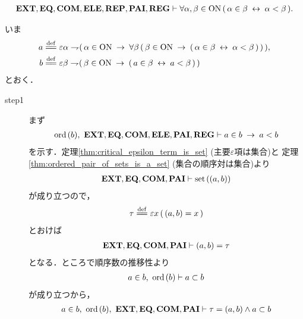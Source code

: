 	\begin{screen}
		\begin{thm}
		\label{thm:element_and_proper_subset_correspond}
			\begin{align}
				\mbox{{\bf EXT}},\mbox{{\bf EQ}},\mbox{\bf COM},\mbox{{\bf ELE}},\mbox{{\bf REP}},\mbox{{\bf PAI}},\mbox{{\bf REG}} 
				\vdash \forall \alpha,\beta \in \mathrm{ON}\, (\, \alpha \in \beta \hspace{0.25em}\leftrightarrow\hspace{0.25em} \alpha < \beta\, ).
			\end{align}
		\end{thm}
	\end{screen}
	
	\begin{prf}
		いま
		\begin{align}
			a &\defeq \varepsilon \alpha \negation 
			(\, \alpha \in \ON \rarrow \forall \beta\, (\, \beta \in \ON \rarrow 
			(\, \alpha \in \beta \lrarrow \alpha < \beta\, )\,) \,), \\
			b &\defeq \varepsilon \beta \negation (\, \beta \in \ON \rarrow 
			(\, a \in \beta \lrarrow a < \beta\, )\,)
		\end{align}
		とおく．
		\begin{description}
			\item[step1] まず
				\begin{align}
					\operatorname*{ord}\hspace{0.15em}(b),\ \mbox{{\bf EXT}},\mbox{{\bf EQ}},\mbox{\bf COM},\mbox{{\bf ELE}},\mbox{{\bf PAI}},\mbox{{\bf REG}} \vdash 
					a \in b \hspace{0.25em}\rightarrow\hspace{0.25em} a < b
				\end{align}
				を示す．定理\ref{thm:critical_epsilon_term_is_set} (主要$\varepsilon$項は集合)と
				定理\ref{thm:ordered_pair_of_sets_is_a_set} (集合の順序対は集合)より
				\begin{align}
					\mbox{{\bf EXT}},\mbox{{\bf EQ}},\mbox{\bf COM},\mbox{{\bf PAI}} \vdash \operatorname*{set}\hspace{0.15em}((a,b))
				\end{align}
				が成り立つので，
				\begin{align}
					\tau \defeq \varepsilon x\, (\, (a,b) = x\, )
				\end{align}
				とおけば
				\begin{align}
					\mbox{{\bf EXT}},\mbox{{\bf EQ}},\mbox{\bf COM},\mbox{{\bf PAI}} \vdash (a,b) = \tau
					\label{fom:element_and_proper_subset_correspond_1}
				\end{align}
				となる．ところで順序数の推移性より
				\begin{align}
					a \in b,\ \operatorname*{ord}\hspace{0.15em}(b) \vdash a \subset b
				\end{align}
				が成り立つから，
				\begin{align}
					a \in b,\ \operatorname*{ord}\hspace{0.15em}(b),\ \mbox{{\bf EXT}},\mbox{{\bf EQ}},\mbox{\bf COM},\mbox{{\bf PAI}} 
					\vdash \tau = (a,b) \wedge a \subset b
				\end{align}

\end{description}
\end{prf}
